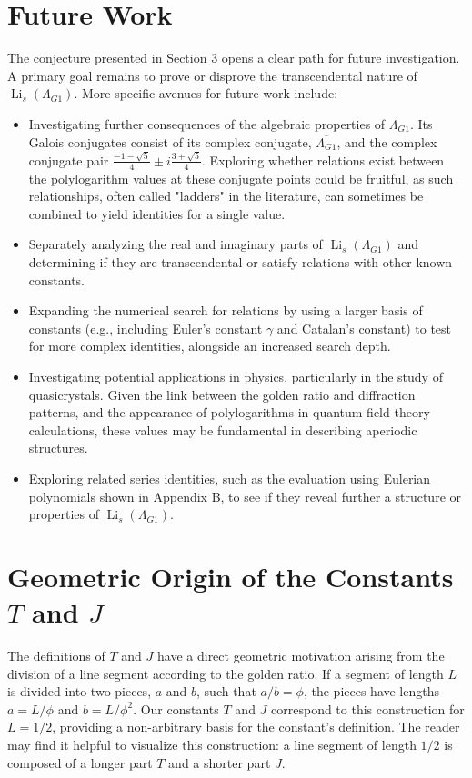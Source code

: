 \documentclass{amsart}
\theoremstyle{plain}
\theoremstyle{definition}
\theoremstyle{remark}
\DeclareMathOperator{\Li}{Li}
\newcommand{\LambdaG}{\Lambda_{G1}}
\newcommand{\phiG}{\phi}
\begin{document}
\section{Future Work}
The conjecture presented in Section 3 opens a clear path for future investigation. A primary goal remains to prove or disprove the transcendental nature of $\Li_s(\LambdaG)$. More specific avenues for future work include:
\begin{itemize}
    \item Investigating further consequences of the algebraic properties of $\LambdaG$. Its Galois conjugates consist of its complex conjugate, $\overline{\LambdaG}$, and the complex conjugate pair $\frac{-1-\sqrt{5}}{4} \pm i\frac{3+\sqrt{5}}{4}$. Exploring whether relations exist between the polylogarithm values at these conjugate points could be fruitful, as such relationships, often called "ladders" in the literature, can sometimes be combined to yield identities for a single value.
    \item Separately analyzing the real and imaginary parts of $\Li_s(\LambdaG)$ and determining if they are transcendental or satisfy relations with other known constants.
    \item Expanding the numerical search for relations by using a larger basis of constants (e.g., including Euler's constant $\gamma$ and Catalan's constant) to test for more complex identities, alongside an increased search depth.
    \item Investigating potential applications in physics, particularly in the study of quasicrystals. Given the link between the golden ratio and diffraction patterns, and the appearance of polylogarithms in quantum field theory calculations, these values may be fundamental in describing aperiodic structures.
    \item Exploring related series identities, such as the evaluation using Eulerian polynomials shown in Appendix B, to see if they reveal further a structure or properties of $\Li_s(\LambdaG)$.
\end{itemize}

\appendix
\section{Geometric Origin of the Constants \texorpdfstring{$T$ and $J$}{T and J}}
The definitions of $T$ and $J$ have a direct geometric motivation arising from the division of a line segment according to the golden ratio. If a segment of length $L$ is divided into two pieces, $a$ and $b$, such that $a/b = \phiG$, the pieces have lengths $a=L/\phiG$ and $b=L/\phiG^2$. Our constants $T$ and $J$ correspond to this construction for $L=1/2$, providing a non-arbitrary basis for the constant's definition. The reader may find it helpful to visualize this construction: a line segment of length $1/2$ is composed of a longer part $T$ and a shorter part $J$.
\end{document}
